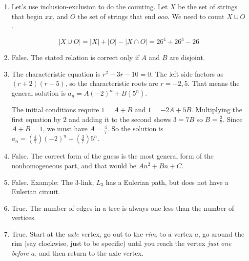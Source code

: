 \begin{enumerate}
\medskip

\item Let's use inclusion-exclusion to do the counting. Let $X$ be the set of strings that begin $xx$, 
and $O$ the set of strings that end $ooo$. We need to count $X\cup O$.

\[
|X\cup O| = |X| + |O| - |X\cap O| = 26^4 + 26^3 - 26
\]

\medskip

\item False. The stated relation is correct only if $A$ and $B$ are disjoint.

\medskip

\item The characteristic equation is $r^2 -3r-10 = 0$. The left side factors as $(r+2)(r-5)$, so the characteristic
roots are $r = -2, 5$. That means the general solution is $a_n = A(-2)^n + B(5^n)$.

The initial conditions require  $1 = A + B$  and $1 = -2A + 5B$. Multiplying the first equation by $2$ and adding
it to the second shows $3 = 7B$ so $\displaystyle B = \frac{3}{7}$. Since $A+B=1$, we must have 
$\displaystyle A= \frac{4}{7}$.
So the solution is $\displaystyle a_n = \left(\frac{4}{7}\right)(-2)^n + \left(\frac{3}{7}\right)5^n$. 

\medskip

\item False. The correct form of the guess is the most general form of the nonhomogeneous part, and that would be
$An^2+Bn+C$.

\medskip

\item False. Example: The $3$-link, $L_{3}$ has a Eulerian path, but does not have a Eulerian circuit.

\medskip 

\item True. The number of edges in a tree is always one less than the number of vertices.
 
\medskip

\item True. Start at the {\it axle} vertex, go out to the {\it rim}, to a vertex $a$, go around the rim
(say clockwise, just to be specific) until you reach the vertex {\it just one before} $a$, and then return
to the axle vertex.


\end{enumerate}

